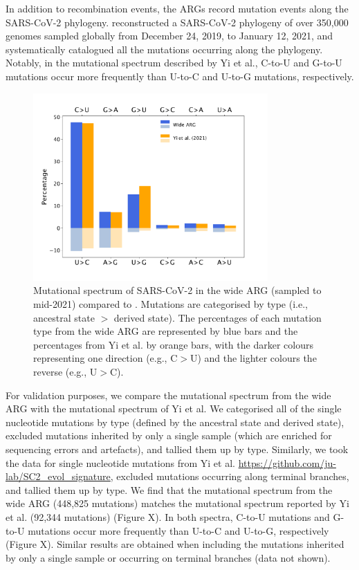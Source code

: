 \documentclass{article}
\begin{document}
In addition to recombination events, the ARGs record mutation events along the
SARS-CoV-2 phylogeny. \cite{Yi2021-sc} reconstructed a SARS-CoV-2
phylogeny of over 350,000 genomes sampled globally from December 24, 2019, to
January 12, 2021, and systematically catalogued all the mutations occurring
along the phylogeny. Notably, in the mutational spectrum described by Yi et
al., C-to-U and G-to-U mutations occur more frequently than U-to-C and U-to-G
mutations, respectively.

\begin{figure}
\centering
\includegraphics[width=0.8\textwidth]{figures/mutational_spectra.pdf}
\caption{\label{fig:mutational_spectra}
Mutational spectrum of SARS-CoV-2 in
the wide ARG (sampled to mid-2021) compared to \cite{Yi2021-sc}.
Mutations are categorised by type (i.e., ancestral state $>$
derived state). The percentages of each mutation type from the wide ARG are
represented by blue bars and the percentages from Yi et al. by orange bars,
with the darker colours representing one direction (e.g., C$>$U) and the
lighter colours the reverse (e.g., U$>$C).}
\end{figure}


For validation purposes, we compare the mutational spectrum from the wide ARG
with the mutational spectrum of Yi et al. We categorised all of the single
nucleotide mutations by type (defined by the ancestral state and derived
state), excluded mutations inherited by only a single sample (which are
enriched for sequencing errors and artefacts), and tallied them up by type.
Similarly, we took the data for single nucleotide mutations from Yi et al.
\url{https://github.com/ju-lab/SC2_evol_signature}, excluded mutations
occurring along terminal branches, and tallied them up by type. We find that
the mutational spectrum from the wide ARG (448,825 mutations) matches the
mutational spectrum reported by Yi et al. (92,344 mutations) (Figure X). In
both spectra, C-to-U mutations and G-to-U mutations occur more frequently than
U-to-C and U-to-G, respectively (Figure X). Similar results are obtained when
including the mutations inherited by only a single sample or occurring on
terminal branches (data not shown).
\end{document}

